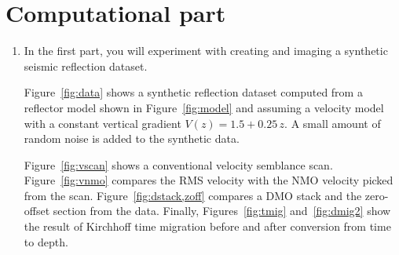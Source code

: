 \section{Computational part}

\begin{enumerate}
\item In the first part, you will experiment with creating and 
  imaging a synthetic seismic reflection dataset.



Figure~\ref{fig:data} shows a synthetic reflection dataset computed
from a reflector model shown in Figure~\ref{fig:model} and assuming a
velocity model with a constant vertical gradient $V(z) = 1.5 +
0.25\,z$. A small amount of random noise is added to the synthetic data.

Figure~\ref{fig:vscan} shows a conventional velocity semblance
scan. Figure~\ref{fig:vnmo} compares the RMS velocity with the NMO
velocity picked from the scan. Figure~\ref{fig:dstack,zoff} compares a
DMO stack and the zero-offset section from the data. Finally,
Figures~\ref{fig:tmig} and~\ref{fig:dmig2} show the result of
Kirchhoff time migration before and after conversion from time to
depth.


\end{enumerate}
